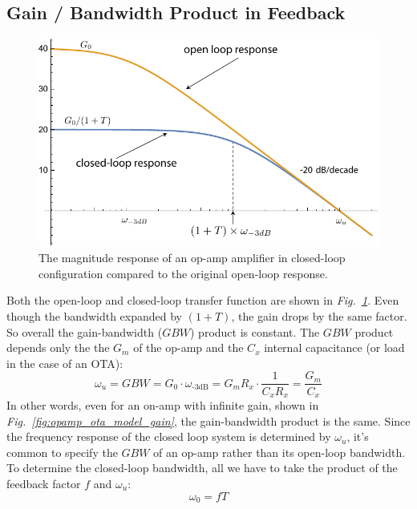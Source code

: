 \subsection{Gain / Bandwidth Product in Feedback}
\begin{figure}[tb]
\centering
\includegraphics[width=.7\columnwidth]{mag1pole_fb}
\caption{The magnitude response of an op-amp amplifier in closed-loop configuration compared to the original open-loop response.}
\label{fig:mag1pole_fb}
\end{figure}
Both the open-loop and closed-loop transfer function are shown in \emph{Fig.~\ref{fig:mag1pole_fb}}.  Even though the bandwidth expanded by $(1+T)$, the gain drops by the same factor. So overall the gain-bandwidth ($GBW$) product is constant. The $GBW$ product depends only the the $G_m$ of the op-amp and the $C_x$ internal capacitance (or load in the case of an OTA):
    \begin{equation}
        \omega_u = GBW = G_0 \cdot \omega_{\text{-3dB}}  = G_m R_x \cdot \frac{1}{C_x R_x} = \frac{G_m}{C_x}
    \end{equation} 
In other words, even for an on-amp with infinite gain, shown in \emph{Fig.~\ref{fig:opamp_ota_model_gain}}, the gain-bandwidth product is the same.  Since the frequency response of the closed loop system is determined by $\omega_u$, it's common to specify the $GBW$ of an op-amp rather than its open-loop bandwidth.  To determine the closed-loop bandwidth, all we have to take the product of the feedback factor $f$ and $\omega_u$:
    \begin{equation}
        \omega_0 = f T
    \end{equation} 
